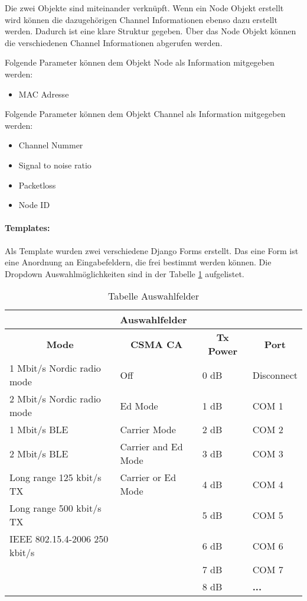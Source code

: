 Die zwei Objekte sind miteinander verknüpft. Wenn ein Node Objekt erstellt wird können die dazugehörigen Channel Informationen ebenso dazu erstellt werden. Dadurch ist eine klare Struktur gegeben. Über das Node Objekt können die verschiedenen Channel Informationen abgerufen werden.

Folgende Parameter können dem Objekt Node als Information mitgegeben werden:
\begin{itemize}
	\item MAC Adresse
\end{itemize} 

Folgende Parameter können dem Objekt Channel als Information mitgegeben werden:
\begin{itemize}
	\item Channel Nummer
	\item Signal to noise ratio
	\item Packetloss
	\item Node ID
\end{itemize}

\paragraph{Templates:}\label{par:2Templates}
Als Template wurden zwei verschiedene Django Forms erstellt. Das eine Form ist eine Anordnung an Eingabefeldern, die frei bestimmt werden können. Die Dropdown Auswahlmöglichkeiten sind in der Tabelle \ref{table:TabelleAuswahlfelder} aufgelistet.

\begin{table}
\centering
\begin{tabular}{|l|l|l|l|} 
\hline
\multicolumn{4}{|c|}{\textbf{Auswahlfelder} } \\ 
\hline
\multicolumn{1}{|c|}{\textbf{Mode} } & \multicolumn{1}{c|}{\textbf{CSMA CA} } & \multicolumn{1}{c|}{\textbf{Tx Power} } & \multicolumn{1}{c|}{\textbf{Port} } \\ 
\hline
1 Mbit/s Nordic radio mode & Off & 0 dB & Disconnect \\ 
\hline
2 Mbit/s Nordic radio mode & Ed Mode & 1 dB & COM 1 \\ 
\hline
1 Mbit/s BLE & Carrier Mode & 2 dB & COM 2 \\ 
\hline
2 Mbit/s BLE & Carrier and Ed Mode & 3 dB & COM 3 \\ 
\hline
Long range 125 kbit/s TX & Carrier or Ed Mode & 4 dB & COM 4 \\ 
\hline
Long range 500 kbit/s TX &  & 5 dB & COM 5 \\ 
\cline{1-1}\cline{3-4}
IEEE 802.15.4-2006 250 kbit/s &  & 6 dB & COM 6 \\ 
\cline{1-1}\cline{3-4}
\multicolumn{1}{l}{} &  & 7 dB & COM 7 \\ 
\cline{3-4}
\multicolumn{1}{l}{} &  & 8 dB & \textbf{...}  \\
\cline{3-4}
\end{tabular}
\caption{Tabelle Auswahlfelder}
\label{table:TabelleAuswahlfelder}
\end{table}


